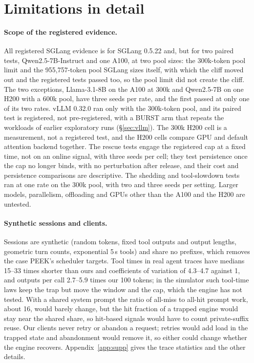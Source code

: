 \section{Limitations in detail}\label{sec:limits-old}

\paragraph{Scope of the registered evidence.} All registered SGLang evidence is for SGLang 0.5.22 and, but for two paired tests, Qwen2.5-7B-Instruct and one A100, at two pool sizes: the 300k-token pool limit and the 955,757-token pool SGLang sizes itself, with which the cliff moved out and the registered tests passed too, so the pool limit did not create the cliff. The two exceptions, Llama-3.1-8B on the A100 at 300k and Qwen2.5-7B on one H200 with a 600k pool, have three seeds per rate, and the first passed at only one of its two rates. vLLM 0.32.0 ran only with the 300k-token pool, and its paired test is registered, not pre-registered, with a BURST arm that repeats the workloads of earlier exploratory runs (\S\ref{sec:vllm}). The 300k H200 cell is a measurement, not a registered test, and the H200 cells compare GPU and default attention backend together. The rescue tests engage the registered cap at a fixed time, not on an online signal, with three seeds per cell; they test persistence once the cap no longer binds, with no perturbation after release, and their cost and persistence comparisons are descriptive. The shedding and tool-slowdown tests ran at one rate on the 300k pool, with two and three seeds per setting. Larger models, parallelism, offloading and GPUs other than the A100 and the H200 are untested.

\paragraph{Synthetic sessions and clients.} Sessions are synthetic (random tokens, fixed tool outputs and output lengths, geometric turn counts, exponential 5\,s tools) and share no prefixes, which removes the case PEEK's scheduler targets. Tool times in real agent traces have medians 15--33 times shorter than ours and coefficients of variation of 4.3--4.7 against 1, and outputs per call 2.7--5.9 times our 100 tokens; in the simulator such tool-time laws keep the trap but move the window and the cap, which the engine has not tested. With a shared system prompt the ratio of all-miss to all-hit prompt work, about 16, would barely change, but the hit fraction of a trapped engine would stay near the shared share, so hit-based signals would have to count private-suffix reuse. Our clients never retry or abandon a request; retries would add load in the trapped state and abandonment would remove it, so either could change whether the engine recovers. Appendix~\ref{app:supp} gives the trace statistics and the other details.

